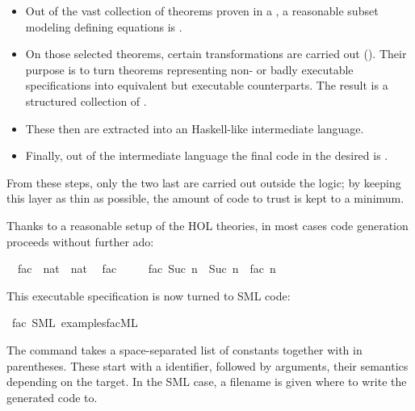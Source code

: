 \begin{isabellebody}
\begin{isamarkuptext}
  \begin{itemize}

    \item Out of the vast collection of theorems proven in a
      , a reasonable subset modeling
      defining equations is .

    \item On those selected theorems, certain
      transformations are carried out
      ().  Their purpose is to turn theorems
      representing non- or badly executable
      specifications into equivalent but executable counterparts.
      The result is a structured collection of .

    \item These  then are extracted
      into an Haskell-like intermediate
      language.

    \item Finally, out of the intermediate language the final
      code in the desired  is .

  \end{itemize}

  From these steps, only the two last are carried out
  outside the logic; by keeping this layer as
  thin as possible, the amount of code to trust is
  kept to a minimum.%
\end{isamarkuptext}%
\isamarkuptrue%
%
\isamarkuptrue%
%
\isamarkuptrue%
%
\begin{isamarkuptext}%
Thanks to a reasonable setup of the HOL theories, in
  most cases code generation proceeds without further ado:%
\end{isamarkuptext}%
\isamarkuptrue%
\isamarkupfalse%
\isanewline
\ \ fac\ {\isacharcolon}{\isacharcolon}\ {\isachardoublequoteopen}nat\ {\isasymRightarrow}\ nat{\isachardoublequoteclose}\isanewline
\isanewline
{}\isamarkupfalse%
\isanewline
\ \ {\isachardoublequoteopen}fac\ {}\ {\isacharequal}\ {}{\isachardoublequoteclose}\isanewline
\ \ {\isachardoublequoteopen}fac\ {\isacharparenleft}Suc\ n{\isacharparenright}\ {\isacharequal}\ Suc\ n\ {\isacharasterisk}\ fac\ n{\isachardoublequoteclose}%
\begin{isamarkuptext}%
This executable specification is now turned to SML code:%
\end{isamarkuptext}%
\isamarkuptrue%
\isamarkupfalse%
\ fac\ {\isacharparenleft}SML\ {\isachardoublequoteopen}examples{\isacharslash}fac{\isachardot}ML{\isachardoublequoteclose}{\isacharparenright}%
\begin{isamarkuptext}%
The \isa{{\isasymCODEGEN}} command takes a space-separated list of
  constants together with 
  in parentheses. These start with a 
  identifier, followed by arguments, their semantics
  depending on the target. In the SML case, a filename
  is given where to write the generated code to.


\end{isamarkuptext}
\end{isabellebody}

